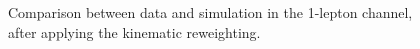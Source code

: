 \begin{figure}[htbp]
{\label{fig:strong:datamc1L:ptlep1}}
\caption{Comparison between data and simulation in the 1-lepton channel, after applying the kinematic reweighting.
}
\label{fig:strong:datamc1L_b}
\end{figure}


